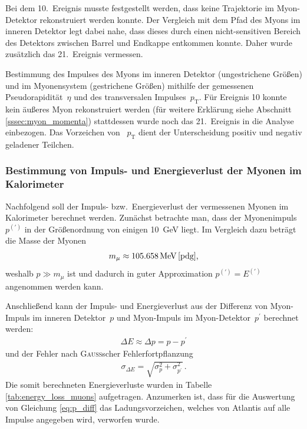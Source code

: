 \documentclass[11pt, a4paper]{article}
\numberwithin{equation}{section}
\begin{document}
Bei dem 10.\ Ereignis musste festgestellt werden, dass keine Trajektorie im Myon-Detektor rekonstruiert werden konnte.
Der Vergleich mit dem Pfad des Myons im inneren Detektor legt dabei nahe, dass dieses durch einen nicht-sensitiven Bereich des Detektors zwischen Barrel und Endkappe entkommen konnte.
Daher wurde zusätzlich das 21.\ Ereignis vermessen.


\begin{table}
	\centering
	
	\caption{Bestimmung des Impulses des Myons im inneren Detektor (ungestrichene Größen) und im Myonensystem (gestrichene Größen) mithilfe der gemessenen Pseudorapidität~$\eta$ und des transversalen Impulses~$p_\mathrm{T}$.
		Für Ereignis 10 konnte kein äußeres Myon rekonstruiert werden (für weitere Erklärung siehe Abschnitt \ref{sssec:myon_momenta}) stattdessen wurde noch das 21.\ Ereignis in die Analyse einbezogen.
		Das Vorzeichen von ~$p_\mathrm{T}$ dient der Unterscheidung positiv und negativ geladener Teilchen.}
	\label{tab:muon_momenta}
\end{table}

\subsubsection{Bestimmung von Impuls- und Energieverlust der Myonen im Kalorimeter}
Nachfolgend soll der Impuls- bzw.\ Energieverlust der vermessenen Myonen im Kalorimeter berechnet werden.
Zunächst betrachte man, dass der Myonenimpuls~$p^{(\prime)}$ in der Größenordnung von einigen \SI{10}{\GeV} liegt.
Im Vergleich dazu beträgt die Masse der Myonen
\begin{align*}
	m_\mu \approx \SI{105.658}{\MeV} \, \cite{pdg} \text{,}
\end{align*}
weshalb $p \gg m_\mu$ ist und dadurch in guter Approximation $p^{(\prime)} = E^{(\prime)}$ angenommen werden kann.

Anschließend kann der Impuls- und Energieverlust aus der Differenz von Myon-Impuls im inneren Detektor~$p$ und Myon-Impuls im Myon-Detektor~$p^\prime$ berechnet werden:
\begin{align}
	\Delta E \approx \Delta p = p - p^\prime
	\label{eq:p_diff}
\end{align}
und der Fehler nach \textsc{Gauß}scher Fehlerfortpflanzung
\begin{align*}
	\sigma_{\Delta E} = \sqrt{\sigma_p^2 + \sigma_{p^\prime}^2} \, \text{.}
\end{align*}
Die somit berechneten Energieverluste wurden in Tabelle \ref{tab:energy_loss_muons} aufgetragen.
Anzumerken ist, dass für die Auswertung von Gleichung \eqref{eq:p_diff} das Ladungsvorzeichen, welches von Atlantis auf alle Impulse angegeben wird, verworfen wurde.
\end{document}
